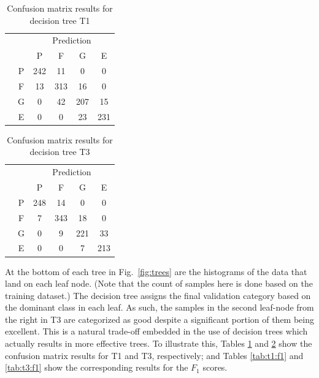 \begin{table}%
	\centering
	\caption{Confusion matrix results for decision tree T1}
	\label{tab:t1:confusion}
	\small
	\begin{tabular}{cccccc}
		& 		& \multicolumn{4}{c}{Prediction}\\ 
		\cline{3-6}
		&   	& P  	& F     & G  	& E 	\\
		\cline{2-6}
		\parbox[t]{2mm}{}  
		& P 	& 242 	& 11 	& 0     & 0    	\\
		& F 	& 13 	& 313   & 16    & 0    	\\
		& G 	& 0 	& 42    & 207   & 15   	\\
		& E 	& 0 	& 0     & 23    & 231	\\ 
	\end{tabular}
\end{table}

\begin{table}%
	\centering
	\caption{Confusion matrix results for decision tree T3}
	\label{tab:t3:confusion}
	\small
	\begin{tabular}{cccccc}
		& 		& \multicolumn{4}{c}{Prediction}\\ 
		\cline{3-6}
		&   	& P  	& F     & G  	& E 	\\
		\cline{2-6}
		\parbox[t]{2mm}{\multirow{4}{*}{\rotatebox[origin=c]{90}{Actual}}}  
		& P 	& 248 	& 14 	& 0     & 0    	\\
		& F 	& 7 	& 343   & 18    & 0    	\\
		& G 	& 0 	& 9 	& 221   & 33   	\\
		& E 	& 0 	& 0     & 7    	& 213	\\ 
	\end{tabular}
\end{table}

At the bottom of each tree in Fig.~\ref{fig:trees} are the histograms of the data that land on each leaf node. (Note that the count of samples here is done based on the training dataset.) The decision tree assigns the final validation category based on the dominant class in each leaf. As such, the samples in the second leaf-node from the right in T3 are categorized as good despite a significant portion of them being excellent. This is a natural trade-off embedded in the use of decision trees which actually results in more effective trees. To illustrate this, Tables \ref{tab:t1:confusion} and \ref{tab:t3:confusion} show the confusion matrix results for T1 and T3, respectively; and Tables \ref{tab:t1:f1} and \ref{tab:t3:f1} show the corresponding results for the $F_1$ scores.

